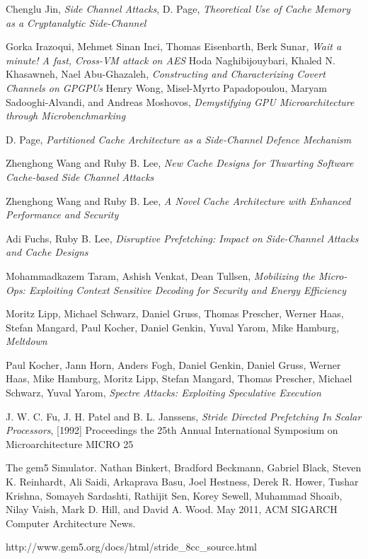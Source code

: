 \documentclass[twoside]{iitbreport}
\begin{document}
%
\begin{thebibliography}{99}
Chenglu Jin, {\it Side Channel Attacks},
D. Page, {\it Theoretical Use of Cache Memory as a Cryptanalytic Side-Channel}

Gorka Irazoqui, Mehmet Sinan Inci, Thomas Eisenbarth, Berk Sunar,  {\it Wait a minute! A fast, Cross-VM attack on AES}
Hoda Naghibijouybari,
Khaled N. Khasawneh,
Nael Abu-Ghazaleh,
{\it Constructing and Characterizing Covert Channels on GPGPUs}
Henry Wong, Misel-Myrto Papadopoulou, Maryam Sadooghi-Alvandi, and Andreas Moshovos, {\it Demystifying GPU Microarchitecture through Microbenchmarking}

D. Page, {\it Partitioned Cache Architecture as a Side-Channel Defence Mechanism}

Zhenghong Wang and Ruby B. Lee, {\it New Cache Designs for Thwarting Software Cache-based Side Channel Attacks}

Zhenghong Wang and Ruby B. Lee, {\it A Novel Cache Architecture with Enhanced Performance and Security}

Adi Fuchs, Ruby B. Lee, {\it Disruptive Prefetching: Impact on Side-Channel Attacks and Cache Designs}

Mohammadkazem Taram, Ashish Venkat, Dean Tullsen, {\it Mobilizing the Micro-Ops: Exploiting Context Sensitive Decoding for Security and Energy Efficiency}

Moritz Lipp, Michael Schwarz, Daniel Gruss, Thomas Prescher, Werner Haas,
Stefan Mangard, Paul Kocher, Daniel Genkin, Yuval Yarom, Mike Hamburg, {\it Meltdown}

Paul Kocher, Jann Horn, Anders Fogh, Daniel Genkin, Daniel Gruss, Werner Haas, Mike Hamburg, Moritz Lipp, Stefan Mangard, Thomas Prescher, Michael Schwarz, Yuval Yarom, {\it Spectre Attacks: Exploiting Speculative Execution}

J. W. C. Fu, J. H. Patel and B. L. Janssens, {\it Stride Directed Prefetching In Scalar Processors}, [1992] Proceedings the 25th Annual International Symposium on Microarchitecture MICRO 25

The gem5 Simulator. Nathan Binkert, Bradford Beckmann, Gabriel Black, Steven K. Reinhardt, Ali Saidi, Arkaprava Basu, Joel Hestness, Derek R. Hower, Tushar Krishna, Somayeh Sardashti, Rathijit Sen, Korey Sewell, Muhammad Shoaib, Nilay Vaish, Mark D. Hill, and David A. Wood. May 2011, ACM SIGARCH Computer Architecture News.

http://www.gem5.org/docs/html/stride\_8cc\_source.html
\end{thebibliography}
\end{document}
